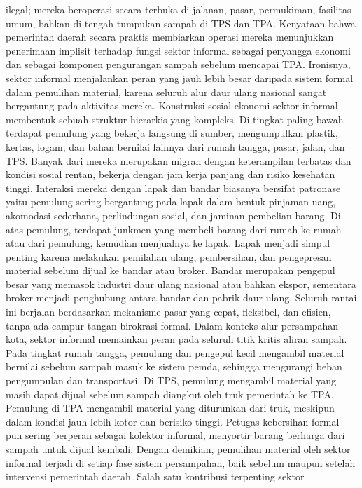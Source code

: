\documentclass[
  letterpaper,
  DIV=11,
  numbers=noendperiod]{scrreprt}
\begin{document}
ilegal; mereka beroperasi secara terbuka di jalanan, pasar, permukiman,
fasilitas umum, bahkan di tengah tumpukan sampah di TPS dan TPA.
Kenyataan bahwa pemerintah daerah secara praktis membiarkan operasi
mereka menunjukkan penerimaan implisit terhadap fungsi sektor informal
sebagai penyangga ekonomi dan sebagai komponen pengurangan sampah
sebelum mencapai TPA. Ironisnya, sektor informal menjalankan peran yang
jauh lebih besar daripada sistem formal dalam pemulihan material, karena
seluruh alur daur ulang nasional sangat bergantung pada aktivitas
mereka. Konstruksi sosial-ekonomi sektor informal membentuk sebuah
struktur hierarkis yang kompleks. Di tingkat paling bawah terdapat
pemulung yang bekerja langsung di sumber, mengumpulkan plastik, kertas,
logam, dan bahan bernilai lainnya dari rumah tangga, pasar, jalan, dan
TPS. Banyak dari mereka merupakan migran dengan keterampilan terbatas
dan kondisi sosial rentan, bekerja dengan jam kerja panjang dan risiko
kesehatan tinggi. Interaksi mereka dengan lapak dan bandar biasanya
bersifat patronase yaitu pemulung sering bergantung pada lapak dalam
bentuk pinjaman uang, akomodasi sederhana, perlindungan sosial, dan
jaminan pembelian barang. Di atas pemulung, terdapat junkmen yang
membeli barang dari rumah ke rumah atau dari pemulung, kemudian
menjualnya ke lapak. Lapak menjadi simpul penting karena melakukan
pemilahan ulang, pembersihan, dan pengepresan material sebelum dijual ke
bandar atau broker. Bandar merupakan pengepul besar yang memasok
industri daur ulang nasional atau bahkan ekspor, sementara broker
menjadi penghubung antara bandar dan pabrik daur ulang. Seluruh rantai
ini berjalan berdasarkan mekanisme pasar yang cepat, fleksibel, dan
efisien, tanpa ada campur tangan birokrasi formal. Dalam konteks alur
persampahan kota, sektor informal memainkan peran pada seluruh titik
kritis aliran sampah. Pada tingkat rumah tangga, pemulung dan pengepul
kecil mengambil material bernilai sebelum sampah masuk ke sistem pemda,
sehingga mengurangi beban pengumpulan dan transportasi. Di TPS, pemulung
mengambil material yang masih dapat dijual sebelum sampah diangkut oleh
truk pemerintah ke TPA. Pemulung di TPA mengambil material yang
diturunkan dari truk, meskipun dalam kondisi jauh lebih kotor dan
berisiko tinggi. Petugas kebersihan formal pun sering berperan sebagai
kolektor informal, menyortir barang berharga dari sampah untuk dijual
kembali. Dengan demikian, pemulihan material oleh sektor informal
terjadi di setiap fase sistem persampahan, baik sebelum maupun setelah
intervensi pemerintah daerah. Salah satu kontribusi terpenting sektor
\end{document}
